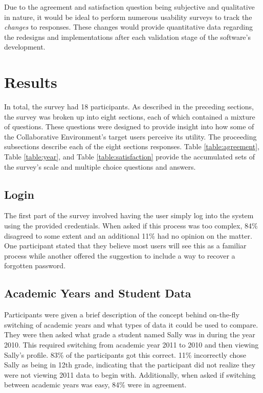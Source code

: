 Due to the agreement and satisfaction question being subjective and qualitative in nature, it would be ideal to perform numerous usability surveys to track the \emph{changes} to responses. These changes would provide quantitative data regarding the redesigns and implementations after each validation stage of the software's development.

\section{Results}
In total, the survey had 18 participants. As described in the preceding sections, the survey was broken up into eight sections, each of which contained a mixture of questions. These questions were designed to provide insight into how some of the Collaborative Environment's target users perceive its utility. The proceeding subsections describe each of the eight sections responses. Table \ref{table:agreement}, Table \ref{table:year}, and Table \ref{table:satisfaction} provide the accumulated sets of the survey's scale and multiple choice questions and answers.

\subsection*{Login}
The first part of the survey involved having the user simply log into the system using the provided credentials. When asked if this process was too complex, 84\% disagreed to some extent and an additional 11\% had no opinion on the matter. One participant stated that they believe most users will see this as a familiar process while another offered the suggestion to include a way to recover a forgotten password.

\subsection*{Academic Years and Student Data}
Participants were given a brief description of the concept behind on-the-fly switching of academic years and what types of data it could be used to compare. They were then asked what grade a student named Sally was in during the year 2010. This required switching from academic year 2011 to 2010 and then viewing Sally's profile. 83\% of the participants got this correct. 11\% incorrectly chose Sally as being in 12th grade, indicating that the participant did not realize they were not viewing 2011 data to begin with. Additionally, when asked if switching between academic years was easy, 84\% were in agreement.

